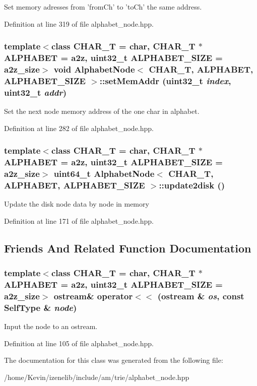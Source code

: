 Set memory adresses from 'fromCh' to 'toCh' the same address. 

Definition at line 319 of file alphabet\_\-node.hpp.\hypertarget{classAlphabetNode_4e025529d12350e14d67452a26ede7ef}{
\subsubsection[{setMemAddr}]{\setlength{\rightskip}{0pt plus 5cm}template$<$class CHAR\_\-T  = char, CHAR\_\-T $\ast$ ALPHABET = a2z, uint32\_\-t ALPHABET\_\-SIZE = a2z\_\-size$>$ void {\bf AlphabetNode}$<$ CHAR\_\-T, ALPHABET, ALPHABET\_\-SIZE $>$::setMemAddr (uint32\_\-t {\em index}, \/  uint32\_\-t {\em addr})}}
\label{classAlphabetNode_4e025529d12350e14d67452a26ede7ef}


Set the next node memory address of the one char in alphabet. 

Definition at line 282 of file alphabet\_\-node.hpp.\hypertarget{classAlphabetNode_fe2a92cfc98d149ef34b04bfa7bd0ac3}{
\subsubsection[{update2disk}]{\setlength{\rightskip}{0pt plus 5cm}template$<$class CHAR\_\-T  = char, CHAR\_\-T $\ast$ ALPHABET = a2z, uint32\_\-t ALPHABET\_\-SIZE = a2z\_\-size$>$ uint64\_\-t {\bf AlphabetNode}$<$ CHAR\_\-T, ALPHABET, ALPHABET\_\-SIZE $>$::update2disk ()}}
\label{classAlphabetNode_fe2a92cfc98d149ef34b04bfa7bd0ac3}


Update the disk node data by node in memory 

Definition at line 171 of file alphabet\_\-node.hpp.

\subsection{Friends And Related Function Documentation}
\hypertarget{classAlphabetNode_d6b3ef7ecb2e9975d8022514f68f74f5}{
\subsubsection[{operator$<$$<$}]{\setlength{\rightskip}{0pt plus 5cm}template$<$class CHAR\_\-T  = char, CHAR\_\-T $\ast$ ALPHABET = a2z, uint32\_\-t ALPHABET\_\-SIZE = a2z\_\-size$>$ ostream\& operator$<$$<$ (ostream \& {\em os}, \/  const {\bf SelfType} \& {\em node})}}
\label{classAlphabetNode_d6b3ef7ecb2e9975d8022514f68f74f5}


Input the node to an ostream. 

Definition at line 105 of file alphabet\_\-node.hpp.

The documentation for this class was generated from the following file:\begin{CompactItemize}
\item 
/home/Kevin/izenelib/include/am/trie/alphabet\_\-node.hpp\end{CompactItemize}

